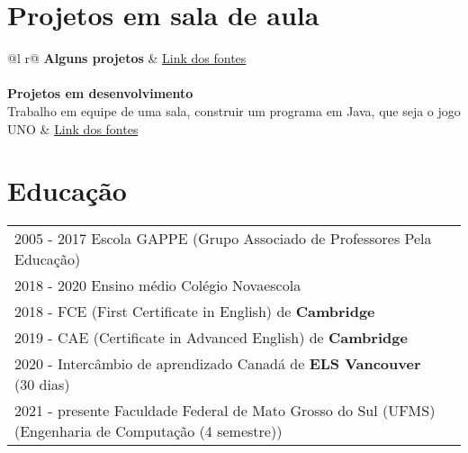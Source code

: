 \documentclass[a4paper,12pt]{article}
\begin{document}
\section{Projetos em sala de aula}

\begin{tabularx}{\linewidth}{ @{}l r@{} }
\textbf{Alguns projetos} & \hfill \href{https://github.com/Joao-Schio/T2}{Link dos fontes} \\[3.75pt]
  \\
\textbf{Projetos em desenvolvimento} \\ {Trabalho em equipe de uma sala, construir um programa em Java, que seja o jogo UNO} & \hfill \href{https://github.com/Joao-Schio/UnoOO}{Link dos fontes} 
\end{tabularx}

\section{Educação}
\begin{tabularx}{\linewidth}{@{}l X@{}}	

2005 - 2017 Escola GAPPE (Grupo Associado de Professores Pela Educação) \\

2018 - 2020 Ensino médio Colégio Novaescola\\

2018 - FCE (First Certificate in English) de  \textbf{Cambridge} \\


2019 - CAE (Certificate in Advanced English)  de  \textbf{Cambridge} \\

2020 - Intercâmbio de aprendizado Canadá   de  \textbf{ELS Vancouver} \hfill  (30 dias) \\

2021 - presente Faculdade Federal de Mato Grosso do Sul (UFMS) (Engenharia de Computação (4 semestre)) \\
\end{tabularx}

\end{document}
